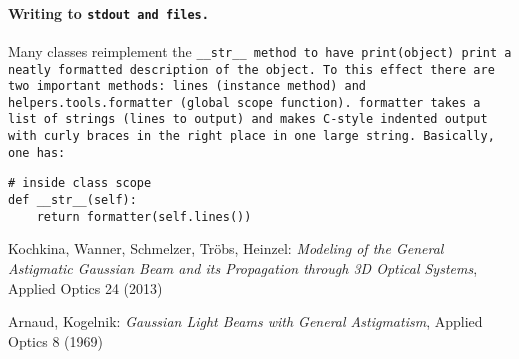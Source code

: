 \documentclass{article}
\begin{document}
\paragraph{Writing to \tt{stdout} and files.}Many classes reimplement the \tt{\_\_str\_\_} method to have \tt{print(object)} print a neatly formatted description of the object. To this effect there are two important methods: \tt{lines} (instance method) and \tt{helpers.tools.formatter} (global scope function). \tt{formatter} takes a list of strings (lines to output) and makes C-style indented output with curly braces in the right place in one large string. Basically, one has:

\begin{lstlisting}
# inside class scope
def __str__(self):
	return formatter(self.lines())

\end{lstlisting}

\begin{thebibliography}{99}

Kochkina, Wanner, Schmelzer, Tr\"obs, Heinzel:
\textit{Modeling of the General Astigmatic Gaussian Beam and its Propagation through 3D Optical Systems},
Applied Optics 24 (2013)

Arnaud, Kogelnik:
\textit{Gaussian Light Beams with General Astigmatism},
Applied Optics 8 (1969)

\end{thebibliography}
\end{document}
